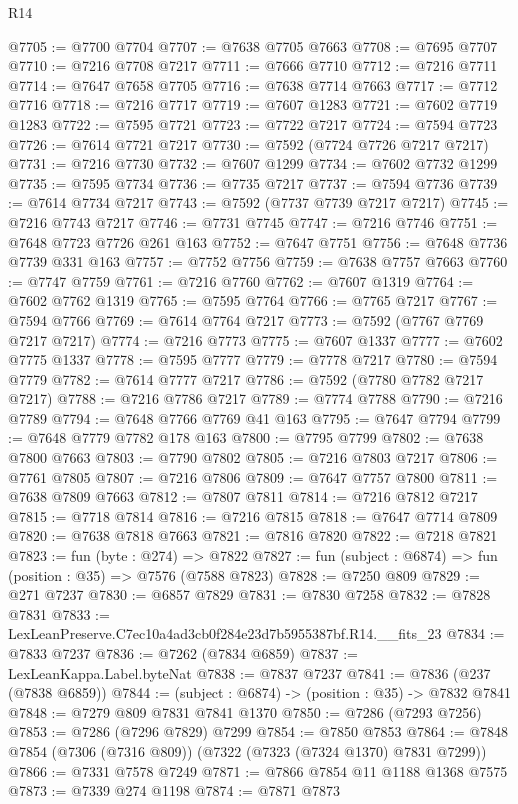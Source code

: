 \begin{lexlean}{R14}
\begin{coremodule}
@7705 := @7700 @7704
@7707 := @7638 @7705 @7663
@7708 := @7695 @7707
@7710 := @7216 @7708 @7217
@7711 := @7666 @7710
@7712 := @7216 @7711
@7714 := @7647 @7658 @7705
@7716 := @7638 @7714 @7663
@7717 := @7712 @7716
@7718 := @7216 @7717
@7719 := @7607 @1283
@7721 := @7602 @7719 @1283
@7722 := @7595 @7721
@7723 := @7722 @7217
@7724 := @7594 @7723
@7726 := @7614 @7721 @7217
@7730 := @7592 (@7724 @7726 @7217 @7217)
@7731 := @7216 @7730
@7732 := @7607 @1299
@7734 := @7602 @7732 @1299
@7735 := @7595 @7734
@7736 := @7735 @7217
@7737 := @7594 @7736
@7739 := @7614 @7734 @7217
@7743 := @7592 (@7737 @7739 @7217 @7217)
@7745 := @7216 @7743 @7217
@7746 := @7731 @7745
@7747 := @7216 @7746
@7751 := @7648 @7723 @7726 @261 @163
@7752 := @7647 @7751
@7756 := @7648 @7736 @7739 @331 @163
@7757 := @7752 @7756
@7759 := @7638 @7757 @7663
@7760 := @7747 @7759
@7761 := @7216 @7760
@7762 := @7607 @1319
@7764 := @7602 @7762 @1319
@7765 := @7595 @7764
@7766 := @7765 @7217
@7767 := @7594 @7766
@7769 := @7614 @7764 @7217
@7773 := @7592 (@7767 @7769 @7217 @7217)
@7774 := @7216 @7773
@7775 := @7607 @1337
@7777 := @7602 @7775 @1337
@7778 := @7595 @7777
@7779 := @7778 @7217
@7780 := @7594 @7779
@7782 := @7614 @7777 @7217
@7786 := @7592 (@7780 @7782 @7217 @7217)
@7788 := @7216 @7786 @7217
@7789 := @7774 @7788
@7790 := @7216 @7789
@7794 := @7648 @7766 @7769 @41 @163
@7795 := @7647 @7794
@7799 := @7648 @7779 @7782 @178 @163
@7800 := @7795 @7799
@7802 := @7638 @7800 @7663
@7803 := @7790 @7802
@7805 := @7216 @7803 @7217
@7806 := @7761 @7805
@7807 := @7216 @7806
@7809 := @7647 @7757 @7800
@7811 := @7638 @7809 @7663
@7812 := @7807 @7811
@7814 := @7216 @7812 @7217
@7815 := @7718 @7814
@7816 := @7216 @7815
@7818 := @7647 @7714 @7809
@7820 := @7638 @7818 @7663
@7821 := @7816 @7820
@7822 := @7218 @7821
@7823 := fun (byte : @274) => @7822
@7827 := fun (subject : @6874) => fun (position : @35) => @7576 (@7588 @7823)
@7828 := @7250 @809
@7829 := @271 @7237
@7830 := @6857 @7829
@7831 := @7830 @7258
@7832 := @7828 @7831
@7833 := LexLeanPreserve.C7ec10a4ad3cb0f284e23d7b5955387bf.R14.__fits_23
@7834 := @7833 @7237
@7836 := @7262 (@7834 @6859)
@7837 := LexLeanKappa.Label.byteNat
@7838 := @7837 @7237
@7841 := @7836 (@237 (@7838 @6859))
@7844 := (subject : @6874) -> (position : @35) -> @7832 @7841
@7848 := @7279 @809 @7831 @7841 @1370
@7850 := @7286 (@7293 @7256)
@7853 := @7286 (@7296 @7829) @7299
@7854 := @7850 @7853
@7864 := @7848 @7854 (@7306 (@7316 @809)) (@7322 (@7323 (@7324 @1370) @7831 @7299))
@7866 := @7331 @7578 @7249
@7871 := @7866 @7854 @11 @1188 @1368 @7575
@7873 := @7339 @274 @1198
@7874 := @7871 @7873

\end{coremodule}
\end{lexlean}
